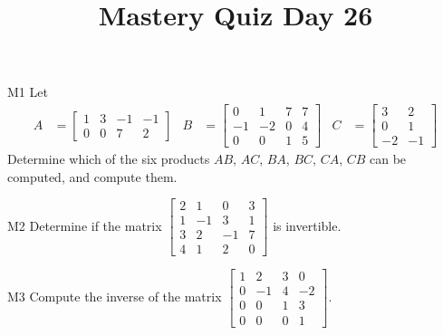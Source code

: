 \documentclass{sbgLAquiz}
\title{Mastery Quiz Day 26 }
\begin{document}
\begin{problem}{M1}
Let
\begin{align*}
A &= \begin{bmatrix} 1 & 3 & -1 & -1 \\ 0 & 0 & 7 & 2 \end{bmatrix} & B &= \begin{bmatrix} 0 & 1 & 7 & 7 \\ -1 & -2 & 0 & 4 \\ 0 & 0 & 1 & 5 \end{bmatrix} & C&=\begin{bmatrix} 3 & 2 \\ 0 & 1 \\ -2 & -1 \end{bmatrix}
\end{align*}
Determine which of the six products $AB$, $AC$, $BA$, $BC$, $CA$, $CB$ can be computed, and compute them.
\end{problem}

\begin{problem}{M2}
Determine if the matrix $\begin{bmatrix} 2 & 1 & 0 & 3 \\ 1 & -1 & 3 & 1 \\ 3 & 2 & -1 & 7 \\ 4 & 1 & 2 & 0 \end{bmatrix}$ is invertible.
\end{problem}
\newpage

\begin{problem}{M3}
Compute the inverse of the matrix $\begin{bmatrix} 1 & 2 & 3 & 0 \\ 0 & -1 & 4 & -2 \\ 0 & 0 & 1 & 3 \\ 0 & 0 & 0 & 1 \end{bmatrix}$.
\end{problem}
\end{document}
